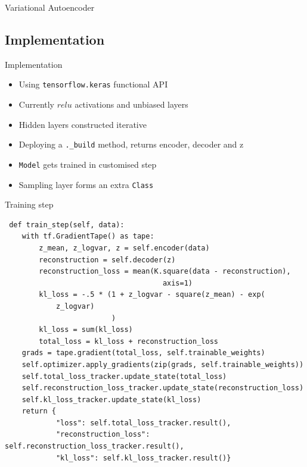 \documentclass{beamer}
\begin{document}
\begin{frame}{Variational Autoencoder}
    \resizebox{\textwidth}{!}{}
\end{frame}

\subsection{Implementation}

\begin{frame}{Implementation}

    \begin{itemize}
        \item Using \texttt{tensorflow.keras} functional API \cite{Chollet2017-yw}
        \item Currently $relu$ activations and unbiased layers
        \item Hidden layers constructed iterative
        \item Deploying a \texttt{.\_build} method, returns encoder, decoder and z
        \item \texttt{Model} gets trained in customised step
        \item Sampling layer forms an extra \texttt{Class}
    \end{itemize}

\end{frame}

\begin{frame}[fragile]{Training step}

    \tiny{
        \begin{verbatim}
 def train_step(self, data):                                                
    with tf.GradientTape() as tape:                                        
        z_mean, z_logvar, z = self.encoder(data)                           
        reconstruction = self.decoder(z)                                   
        reconstruction_loss = mean(K.square(data - reconstruction),      
                                     axis=1)                               
        kl_loss = -.5 * (1 + z_logvar - square(z_mean) - exp(          
            z_logvar)                                                      
                         )                                                 
        kl_loss = sum(kl_loss)                                           
        total_loss = kl_loss + reconstruction_loss                         
    grads = tape.gradient(total_loss, self.trainable_weights)              
    self.optimizer.apply_gradients(zip(grads, self.trainable_weights))     
    self.total_loss_tracker.update_state(total_loss)                       
    self.reconstruction_loss_tracker.update_state(reconstruction_loss)     
    self.kl_loss_tracker.update_state(kl_loss)                             
    return {                                                               
            "loss": self.total_loss_tracker.result(),                      
            "reconstruction_loss": self.reconstruction_loss_tracker.result(),
            "kl_loss": self.kl_loss_tracker.result()}
        \end{verbatim}
    }
\end{frame}
\end{document}
